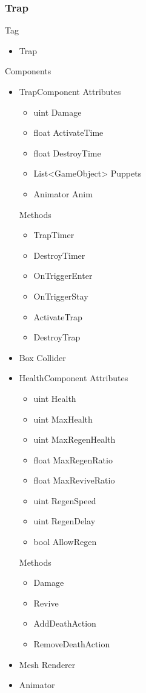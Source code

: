 \documentclass[11pt]{article}
\begin{document}
\subsubsection{Trap}
Tag
\begin{itemize}
\item Trap
\end{itemize}
Components
\begin{itemize}
\item TrapComponent
\newline Attributes
\begin{itemize}
\item uint Damage
\item float ActivateTime
\item float DestroyTime
\item List<GameObject> Puppets
\item Animator Anim
\end{itemize}
Methods
\begin{itemize}
\item TrapTimer
\item DestroyTimer
\item OnTriggerEnter
\item OnTriggerStay
\item ActivateTrap
\item DestroyTrap
\end{itemize}
\item Box Collider
\item HealthComponent
\newline Attributes
\begin{itemize}
\item uint Health
\item uint MaxHealth
\item uint MaxRegenHealth
\item float MaxRegenRatio
\item float MaxReviveRatio
\item uint RegenSpeed
\item uint RegenDelay
\item bool AllowRegen
\end{itemize}
Methods
\begin{itemize}
\item Damage
\item Revive
\item AddDeathAction
\item RemoveDeathAction
\end{itemize}
\item Mesh Renderer
\item Animator
\end{itemize}
\end{document}
